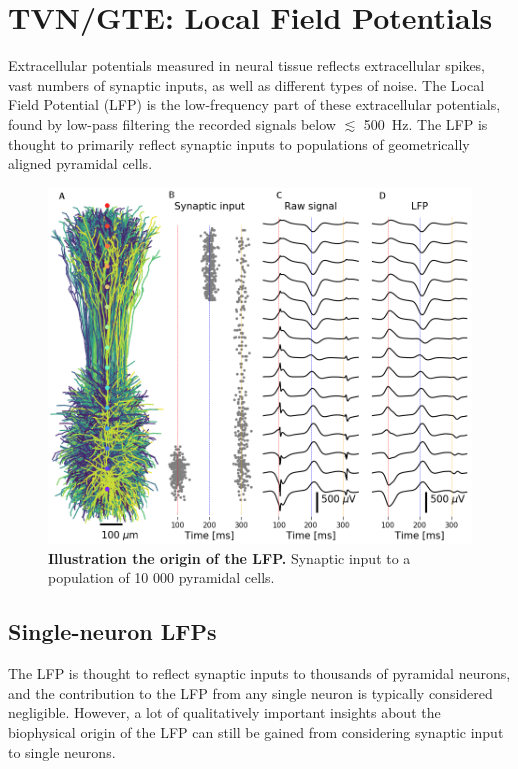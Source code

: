 \chapter{TVN/GTE: Local Field Potentials}
\label{sec:LFP}

Extracellular potentials measured in neural tissue reflects extracellular spikes, vast numbers of synaptic inputs, as well as different types of noise. The Local Field Potential (LFP) is the low-frequency part of these extracellular potentials, found by low-pass filtering the recorded signals below $\lesssim$ 500~Hz. The LFP is thought to primarily reflect synaptic inputs to populations of geometrically aligned pyramidal cells.

\begin{figure}[!ht]
\begin{center}
\includegraphics[width=.7\textwidth]{Figures/LFP/population_LFP.png}
\end{center}
\caption{\textbf{Illustration the origin of the LFP.}
Synaptic input to a population of 10 000 pyramidal cells.
}
\label{LFP:fig:LFP_pop_origin}
\end{figure}

\section{Single-neuron LFPs}
The LFP is thought to reflect synaptic inputs to thousands of pyramidal neurons, and the contribution to the LFP from any single neuron is typically considered negligible. However, a lot of qualitatively important insights about the biophysical origin of the LFP can still be gained from considering synaptic input to single neurons. 

